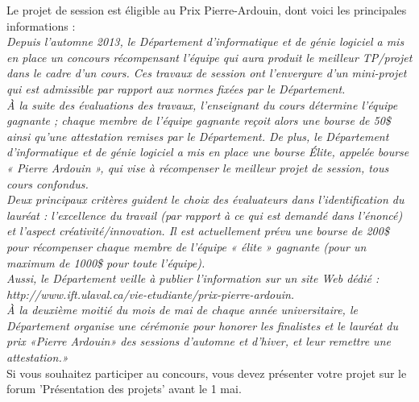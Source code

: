 \documentclass[12pt]{article}
\newcommand{\state}{\noindent}
\begin{document}
\state
Le projet de session est éligible au Prix Pierre-Ardouin, dont voici les principales informations : \\

\state
\textit{Depuis l'automne 2013, le Département d'informatique et de génie logiciel a mis en place un concours récompensant l'équipe qui aura produit le meilleur TP/projet dans le cadre d'un cours. Ces travaux de session ont l'envergure d'un mini-projet qui est admissible par rapport aux normes fixées par le Département.} \\

\state
\textit{À la suite des évaluations des travaux, l'enseignant du cours détermine l'équipe gagnante ; chaque membre de l'équipe gagnante reçoit alors une bourse de 50\$ ainsi qu'une attestation remises par le Département.
De plus, le Département d'informatique et de génie logiciel a mis en place une bourse Élite, appelée bourse « Pierre Ardouin », qui vise à récompenser le meilleur projet de session, tous cours confondus.} \\

\state
\textit{Deux principaux critères guident le choix des évaluateurs dans l'identification du lauréat : l'excellence du travail (par rapport à ce qui est demandé dans l'énoncé) et l'aspect créativité/innovation. Il est actuellement prévu une bourse de 200\$ pour récompenser chaque membre de l'équipe « élite » gagnante (pour un maximum de 1000\$ pour toute l'équipe).} \\

\state
\textit{Aussi, le Département veille à publier l'information sur un site Web dédié : http://www.ift.ulaval.ca/vie-etudiante/prix-pierre-ardouin.} \\

\state
\textit{À la deuxième moitié du mois de mai de chaque année universitaire, le Département organise une cérémonie pour honorer les finalistes et le lauréat du prix «Pierre Ardouin» des sessions d'automne et d'hiver, et leur remettre une attestation.»} \\

\state
Si vous souhaitez participer au concours, vous devez présenter votre projet sur
le forum 'Présentation des projets' avant le 1 mai.
\end{document}
